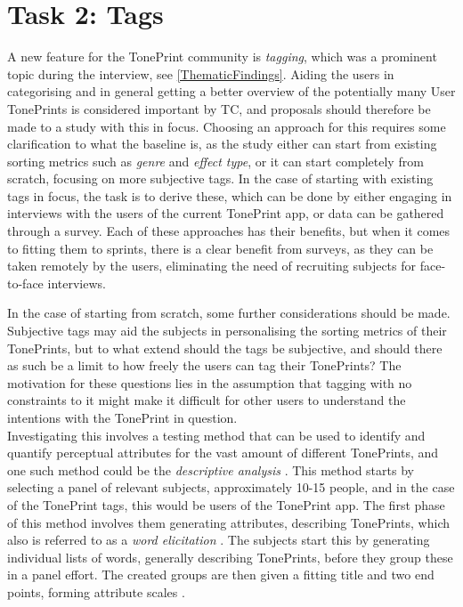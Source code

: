 \section{Task 2: Tags}
\label{Task2}
A new feature for the TonePrint community is \textit{tagging}, which was a prominent topic during the interview, see \autoref{ThematicFindings}. Aiding the users in categorising and in general getting a better overview of the potentially many User TonePrints is considered important by TC, and proposals should therefore be made to a study with this in focus. Choosing an approach for this requires some clarification to what the baseline is, as the study either can start from existing sorting metrics such as \textit{genre} and \textit{effect type}, or it can start completely from scratch, focusing on more subjective tags. In the case of starting with existing tags in focus, the task is to derive these, which can be done by either engaging in interviews with the users of the current TonePrint app, or data can be gathered through a survey. Each of these approaches has their benefits, but when it comes to fitting them to sprints, there is a clear benefit from surveys, as they can be taken remotely by the users, eliminating the need of recruiting subjects for face-to-face interviews.

In the case of starting from scratch, some further considerations should be made. Subjective tags may aid the subjects in personalising the sorting metrics of their TonePrints, but to what extend should the tags be subjective, and should there as such be a limit to how freely the users can tag their TonePrints? The motivation for these questions lies in the assumption that tagging with no constraints to it might make it difficult for other users to understand the intentions with the TonePrint in question. \\

\noindent
Investigating this involves a testing method that can be used to identify and quantify perceptual attributes for the vast amount of different TonePrints, and one such method could be the \textit{descriptive analysis} \parencite{PDF:DescriptiveAnalysis}. This method starts by selecting a panel of relevant subjects, approximately 10-15 people, and in the case of the TonePrint tags, this would be users of the TonePrint app. The first phase of this method involves them generating attributes, describing TonePrints, which also is referred to as a \textit{word elicitation} \parencite[][6-7]{PDF:DescriptiveAnalysis}. The subjects start this by generating individual lists of words, generally describing TonePrints, before they group these in a panel effort. The created groups are then given a fitting title and two end points, forming attribute scales \parencite[][7-9]{PDF:DescriptiveAnalysis}.

